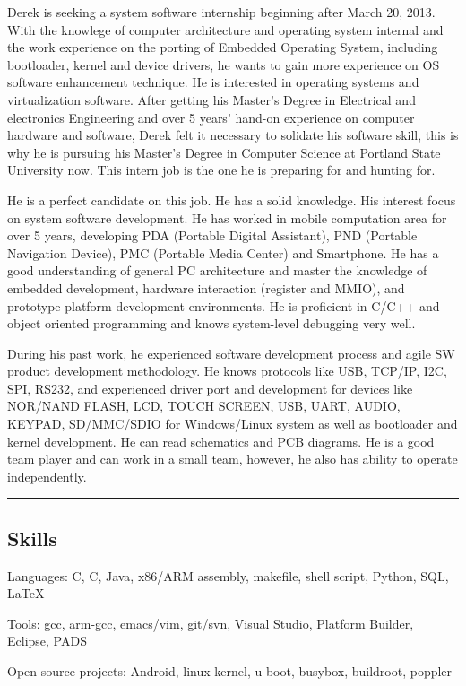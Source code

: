 \documentclass[10pt,letterpaper]{article}
\newenvironment{indentsection}[1]%
{\begin{list}{}%
	{\setlength{\leftmargin}{#1}}%
	\item[]%
}
{\end{list}}
\newcommand{\CPP}
{C\nolinebreak[4]\hspace{-.05em}\raisebox{.22ex}{\footnotesize\bf ++}}
\begin{document}
\begin{indentsection}{\parindent}
Derek is seeking a system software internship beginning after March 20, 2013. With the knowlege of computer architecture and operating system internal and the work experience on the porting of Embedded Operating System, including bootloader, kernel and device drivers, he wants to gain more experience on OS software enhancement technique. He is interested in operating systems and virtualization software. After getting his Master's Degree in Electrical and electronics Engineering and over 5 years' hand-on experience on computer hardware and software, Derek felt it necessary to solidate his software skill, this is why he is pursuing his Master's Degree in Computer Science at Portland State University now. This intern job is the one he is preparing for and hunting for.

He is a perfect candidate on this job. He has a solid knowledge. His interest focus on system software development. He has worked in mobile computation area for over 5 years, developing PDA (Portable Digital Assistant), PND (Portable Navigation Device), PMC (Portable Media Center) and Smartphone. He has a good understanding of general PC architecture and master the knowledge of embedded development, hardware interaction (register and MMIO), and prototype platform development environments. He is proficient in C/C++ and object oriented programming and knows system-level debugging very well.

During his past work, he experienced software development process and agile SW product development methodology. He knows protocols like USB, TCP/IP, I2C, SPI, RS232, and experienced driver port and development for devices like NOR/NAND FLASH, LCD, TOUCH SCREEN, USB, UART, AUDIO, KEYPAD, SD/MMC/SDIO for Windows/Linux system as well as bootloader and kernel development. He can read schematics and PCB diagrams. He is a good team player and can work in a small team, however, he also has ability to operate independently.
\end{indentsection}

\hrule
\vspace{-0.4em}
\subsection*{Skills}

\begin{indentsection}{\parindent}
\begin{description*}
	\item[Languages:]
	C, \CPP, Java, x86/ARM assembly, makefile, shell script, Python, SQL, \LaTeX
	\item[Tools:]
	gcc, arm-gcc, emacs/vim, git/svn, Visual Studio, Platform Builder, Eclipse, PADS
	\item[Open source projects:]
	Android, linux kernel, u-boot, busybox, buildroot, poppler
\end{description*}
\end{indentsection}
\end{document}
